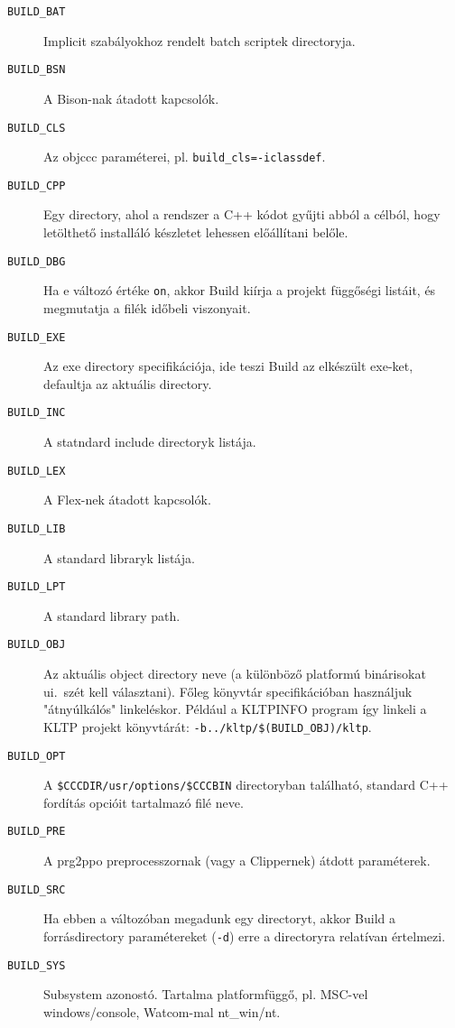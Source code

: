 \begin{description}
\item[{\tt BUILD\_BAT}]  
  Implicit szabályokhoz rendelt batch scriptek directoryja.


\item[{\tt BUILD\_BSN}]  
  A Bison-nak átadott kapcsolók.


\item[{\tt BUILD\_CLS}]  
  Az objccc paraméterei, pl. \verb'build_cls=-iclassdef'.


\item[{\tt BUILD\_CPP}]  
  Egy directory, ahol a rendszer a C++ kódot gyűjti abból a célból,
  hogy letölthető installáló készletet lehessen előállítani belőle.
 

\item[{\tt BUILD\_DBG}]  
  Ha e változó értéke {\tt on}, akkor Build kiírja a projekt
  függőségi listáit, és megmutatja a filék időbeli viszonyait.


\item[{\tt BUILD\_EXE}]  
  Az exe directory specifikációja, ide teszi Build az elkészült 
  exe-ket, defaultja az aktuális directory.

\item[{\tt BUILD\_INC}]  
  A statndard include directoryk listája.

\item[{\tt BUILD\_LEX}]  
  A Flex-nek átadott kapcsolók.

\item[{\tt BUILD\_LIB}]  
  A standard libraryk listája.

\item[{\tt BUILD\_LPT}]  
  A standard library path.

\item[{\tt BUILD\_OBJ}]  
  Az aktuális object directory neve 
  (a különböző platformú binárisokat ui.\  szét kell választani).
  Főleg könyvtár specifikációban használjuk "átnyúlkálós" linkeléskor.
  Például a KLTPINFO program így linkeli a KLTP projekt könyvtárát:
   \verb'-b../kltp/$(BUILD_OBJ)/kltp'.

\item[{\tt BUILD\_OPT}]  
  A \verb!$CCCDIR/usr/options/$CCCBIN! directoryban
  található, standard C++ fordítás opcióit tartalmazó filé neve.

\item[{\tt BUILD\_PRE}]  
  A prg2ppo preprocesszornak (vagy a Clippernek) átdott paraméterek.


\item[{\tt BUILD\_SRC}]  
  Ha ebben a változóban megadunk egy directoryt, akkor Build
  a forrásdirectory paramétereket ({\tt -d}) erre a directoryra
  relatívan értelmezi.


\item[{\tt BUILD\_SYS}]  
  Subsystem azonostó. Tartalma platformfüggő, pl. MSC-vel windows/console, 
  Watcom-mal nt\_win/nt.
\end{description}
 

